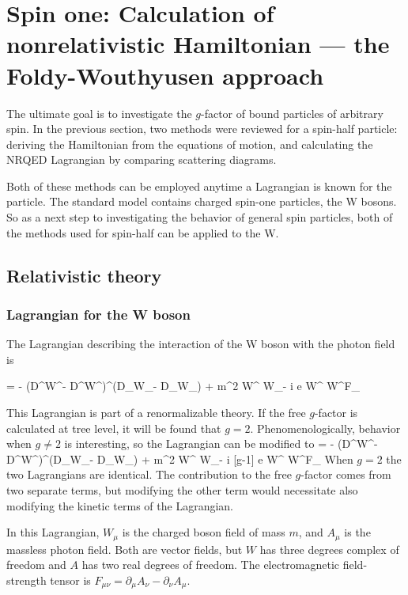\chapter{Spin one: Calculation of nonrelativistic Hamiltonian  --- the Foldy-Wouthyusen approach}


The ultimate goal is to investigate the $g$-factor of bound particles of arbitrary spin.  In the previous section, two methods were reviewed for a spin-half particle: deriving the Hamiltonian from the equations of motion, and calculating the NRQED Lagrangian by comparing scattering diagrams.  

Both of these methods can be employed anytime a Lagrangian is known for the particle.  The standard model contains charged spin-one particles, the W bosons.  So as a next step to investigating the behavior of general spin particles, both of the methods used for spin-half can be applied to the W.

\section{Relativistic theory}

\subsection{Lagrangian for the W boson}
The Lagrangian describing the interaction of the W boson with the photon field is

\beq
{} 
	=	- (D^\mu W^\nu - D^\nu W^\mu)^\dagger (D_\mu W_\nu - D_\nu W_\mu)
		+ m^2 W^{\mu \dagger} W_\mu - i e  W^{\mu \dagger} W^\nu F_{\mu\nu}
\eeq

This Lagrangian is part of a renormalizable theory.  If the free $g$-factor is calculated at tree level, it will be found that $g=2$.  Phenomenologically, behavior when $g \neq 2$ is interesting, so the Lagrangian can be modified to
\beq \label{eq:S1:LagrangianAnom}
	=	- (D^\mu W^\nu - D^\nu W^\mu)^\dagger (D_\mu W_\nu - D_\nu W_\mu)
		+ m^2 W^{\mu \dagger} W_\mu - i [g-1] e  W^{\mu \dagger} W^\nu F_{\mu\nu}
\eeq
When $g=2$ the two Lagrangians are identical.  The contribution to the free $g$-factor comes from two separate terms, but modifying the other term would necessitate also modifying the kinetic terms of the Lagrangian.  %

In this Lagrangian, $W_\mu$ is the charged boson field of mass $m$, and $A_\mu$ is the massless photon field.  Both are vector fields, but $W$ has three degrees complex of freedom and $A$ has two real degrees of freedom.    The electromagnetic field-strength tensor is $F_{\mu\nu} = \partial_\mu A_\nu - \partial_\nu A_\mu$.  

